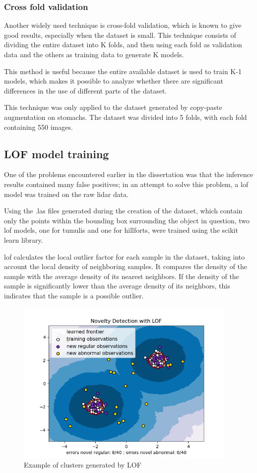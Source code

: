 \subsubsection{Cross fold validation}
Another widely used technique is cross-fold validation, which is known to give good results, especially when the dataset is small. This technique consists of dividing the entire dataset into K folds, and then using each fold as validation data and the others as training data to generate K models.

This method is useful because the entire available dataset is used to train K-1 models, which makes it possible to analyze whether there are significant differences in the use of different parts of the dataset.

This technique was only applied to the dataset generated by copy-paste augmentation on stomachs. The dataset was divided into 5 folds, with each fold containing 550 images.

\subsection{LOF model training}
One of the problems encountered earlier in the dissertation was that the inference results contained many false positives; in an attempt to solve this problem, a \ac{lof} model was trained on the raw \ac{lidar} data.

Using the .las files generated during the creation of the dataset, which contain only the points within the bounding box surrounding the object in question, two \ac{lof} models, one for tumulis and one for hillforts, were trained using the scikit learn library\cite{lof}.

\ac{lof} calculates the local outlier factor for each sample in the dataset, taking into account the local density of neighboring samples. It compares the density of the sample with the average density of its nearest neighbors. If the density of the sample is significantly lower than the average density of its neighbors, this indicates that the sample is a possible outlier.

\begin{figure}[H]
\centering
\includegraphics[height=8cm]{images/lof_example.png}
\caption{Example of clusters generated by LOF}
\end{figure}

